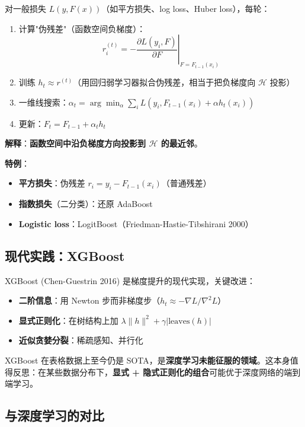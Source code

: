 \documentclass[12pt, a4paper]{ctexart}
\begin{document}
\begin{blackboard}

对一般损失 $L(y, F(x))$（如平方损失、log loss、Huber loss），每轮：
\begin{enumerate}
\item 计算"伪残差"（函数空间负梯度）：
\[
r_i^{(t)} = -\left.\frac{\partial L(y_i, F)}{\partial F}\right|_{F=F_{t-1}(x_i)}
\]
\item 训练 $h_t \approx r^{(t)}$（用回归弱学习器拟合伪残差，相当于把负梯度向 $\mathcal{H}$ 投影）
\item 一维线搜索：$\alpha_t = \arg\min_\alpha \sum_i L(y_i, F_{t-1}(x_i) + \alpha h_t(x_i))$
\item 更新：$F_t = F_{t-1} + \alpha_t h_t$
\end{enumerate}

\textbf{解释}：\textbf{函数空间中沿负梯度方向投影到 $\mathcal{H}$ 的最近邻}。

\textbf{特例}：
\begin{itemize}
\item \textbf{平方损失}：伪残差 $r_i = y_i - F_{t-1}(x_i)$（普通残差）
\item \textbf{指数损失}（二分类）：还原 AdaBoost
\item \textbf{Logistic loss}：LogitBoost（Friedman-Hastie-Tibshirani 2000）
\end{itemize}

\end{blackboard}

\subsection{现代实践：XGBoost}

XGBoost (Chen-Guestrin 2016) 是梯度提升的现代实现，关键改进：
\begin{itemize}
\item \textbf{二阶信息}：用 Newton 步而非梯度步（$h_t \approx -\nabla L / \nabla^2 L$）
\item \textbf{显式正则化}：在树结构上加 $\lambda \|h\|^2 + \gamma |\text{leaves}(h)|$
\item \textbf{近似贪婪分裂}：稀疏感知、并行化
\end{itemize}

XGBoost 在表格数据上至今仍是 SOTA，是\textbf{深度学习未能征服的领域}。这本身值得反思：在某些数据分布下，\textbf{显式 + 隐式正则化的组合}可能优于深度网络的端到端学习。

\subsection{与深度学习的对比}
\end{document}
